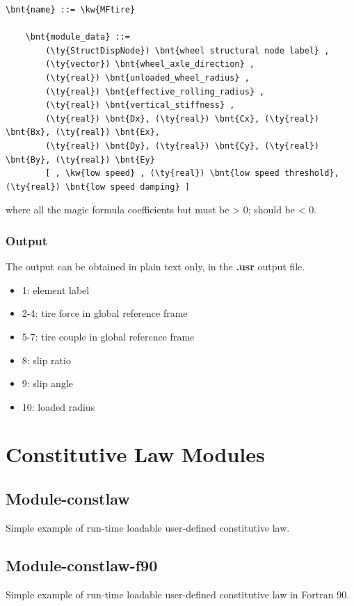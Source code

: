 \begin{Verbatim}[commandchars=\\\{\}]
    \bnt{name} ::= \kw{MFtire}

    \bnt{module_data} ::=
        (\ty{StructDispNode}) \bnt{wheel structural node label} , 
        (\ty{vector}) \bnt{wheel_axle_direction} ,
        (\ty{real}) \bnt{unloaded_wheel_radius} ,
        (\ty{real}) \bnt{effective_rolling_radius} ,
        (\ty{real}) \bnt{vertical_stiffness} ,
        (\ty{real}) \bnt{Dx}, (\ty{real}) \bnt{Cx}, (\ty{real}) \bnt{Bx}, (\ty{real}) \bnt{Ex},
        (\ty{real}) \bnt{Dy}, (\ty{real}) \bnt{Cy}, (\ty{real}) \bnt{By}, (\ty{real}) \bnt{Ey}
        [ , \kw{low speed} , (\ty{real}) \bnt{low speed threshold}, (\ty{real}) \bnt{low speed damping} ]
\end{Verbatim}

\noindent
where all the magic formula coefficients but  must be > 0;  should be < 0.

\subsubsection{Output}
The output can be obtained in plain text only, in the \textbf{.usr} output file.

\begin{itemize}
\item 1: element label
\item 2-4: tire force in global reference frame
\item 5-7: tire couple in global reference frame
\item 8:  slip ratio
\item 9: slip angle
\item 10: loaded radius
\end{itemize}




\section{Constitutive Law Modules}

\subsection{Module-constlaw}
Simple example of run-time loadable user-defined constitutive law.

\subsection{Module-constlaw-f90}
Simple example of run-time loadable user-defined constitutive law in Fortran 90.

